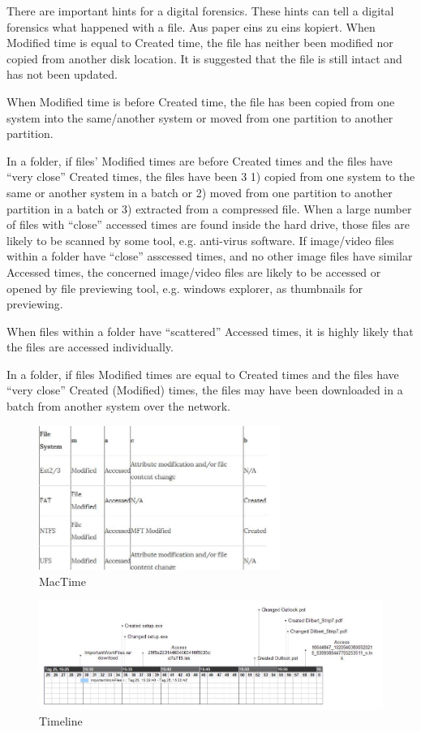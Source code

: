 \newline \newline There are important hints for a digital forensics. These hints can tell a digital forensics what happened with a file. Aus paper eins zu eins kopiert.
When Modified time is equal to Created time, the file has neither been modified nor copied from another disk location. It is suggested that the file is still intact and has not been updated.

When Modified time is before Created time, the file has been copied from one system into the same/another system or moved from one partition to another partition.

In a folder, if files’ Modified times are before Created times and the files have “very close” Created times, the files have been 3
1) copied from one system to the same or another system in a
batch or
2) moved from one partition to another partition in a batch
or
3) extracted from a compressed file.
When a large number of files with “close” accessed times are found inside the hard drive, those files are likely to be scanned by some tool, e.g. anti-virus software.
If image/video files within a folder have “close” asscessed times, and no other image files have similar Accessed times,
the concerned image/video files are likely to be accessed or opened by file previewing tool, e.g. windows explorer, as
thumbnails for previewing.

When files within a folder have “scattered” Accessed times, it is highly likely that the files are accessed individually.

In a folder, if files Modified times are equal to Created times and the files have “very close” Created (Modified) times, the files may have been downloaded in a batch from another system over the network.


\begin{figure}[tbph]
	\centering
	\includegraphics[width=0.7\textwidth]{graphics/mactime}
	\caption{MacTime}
	\label{fig:Mactime}
\end{figure}

\begin{figure}[tbph]
\centering
\includegraphics[width=\textwidth]{graphics/timeline}
\caption{Timeline}
\label{fig:timeline}
\end{figure}
